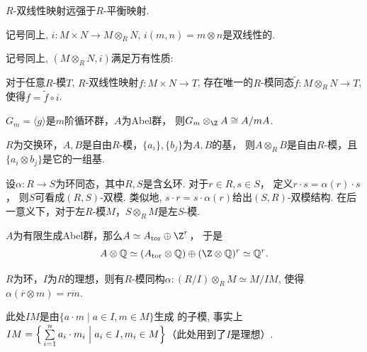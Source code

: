 \begin{remark}
    $R$-双线性映射远强于$R$-平衡映射.
\end{remark}

\begin{proposition}
    记号同上, $i:M\times N\rightarrow M\otimes_R N$, $i(m,n)=m\otimes n$是双线性的.
\end{proposition}

\begin{proposition}
    记号同上, $(M\otimes_R N,i)$满足万有性质:\par
    \qquad 对于任意$R$-模$T$, $R$-双线性映射$f: M\times N\rightarrow T$, 
    存在唯一的$R$-模同态$\tilde{f}: M\otimes_R N\rightarrow T$, 
    使得$f=\tilde{f}\circ i$.

\end{proposition}

\begin{example}
    $G_m=\langle g\rangle$是$m$阶循环群，$A$为Abel群，
    则$G_m\otimes_\Z A\cong A/mA$.
\end{example}

\begin{example}
    $R$为交换环，$A,B$是自由$R$-模，$\{a_i\},\{b_j\}$为$A,B$的基，
    则$A\otimes_R B$是自由$R$-模，且$\{a_i\otimes b_j\}$是它的一组基.
\end{example}

\begin{example}
    设$\alpha:R\rightarrow S$为环同态，其中$R,S$是含幺环. 对于$r\in R,s\in S$，
    定义$r\cdot s=\alpha(r)\cdot s$，
    则$S$可看成$(R,S)$-双模. 类似地, $s\cdot r=s\cdot \alpha(r)$给出$(S,R)$-双模结构. 
    在后一意义下，对于左$R$-模$M$，$S\otimes_R M$是左$S$-模.
\end{example}

\begin{example}
    $A$为有限生成Abel群，那么$A\simeq A_{\textup{tor}}\oplus\Z^r$，
    于是$$A\otimes \mathbb{Q}\simeq
    (A_{\textup{tor}}\otimes\mathbb{Q})\oplus(\Z\otimes\mathbb{Q})^r
    \simeq\mathbb{Q}^r.$$
\end{example}

\begin{proposition}
    $R$为环，$I$为$R$的理想，则有$R$-模同构$\alpha:(R/I)\otimes_R M\simeq M/IM$, 使得
$\alpha(\overline{r}\otimes m)=\overline{rm}$.\par
\qquad 此处$IM$是由$\{a\cdot m\mid a\in I, m\in M\}$生成
的子模, 事实上$IM=\Big\{\sum\limits_{i=1}^n a_i\cdot m_i\Bigm| a_i\in I, m_i\in M\Big\}$（此处用到了$I$是理想）.
\end{proposition}

